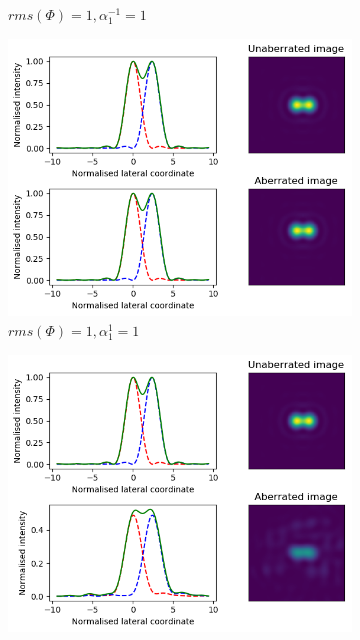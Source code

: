 \begin{figure}
\begin{subfigure}{0.49\textwidth}
		\caption{$rms(\Phi) = 1, \alpha_{1}^{-1} = 1$}
		\label{fig:Airy_ring_2D_2_object_seperation_aberration_comparison_Noll_2}
	\end{subfigure}
	\begin{subfigure}{0.49\textwidth}
		\centering
		\includegraphics[width=\linewidth]{images/Airy_ring_2D_2_object_seperation_aberration_comparison_Noll_3.png}
		\caption{$rms(\Phi) = 1, \alpha_{1}^{1} = 1$}
		\label{fig:Airy_ring_2D_2_object_seperation_aberration_comparison_Noll_3}
	\end{subfigure}
	\begin{subfigure}{0.49\textwidth}
		\centering
		\includegraphics[width=\linewidth]{images/Airy_ring_2D_2_object_seperation_aberration_comparison_rms_1.png}

\end{subfigure}
\end{figure}
